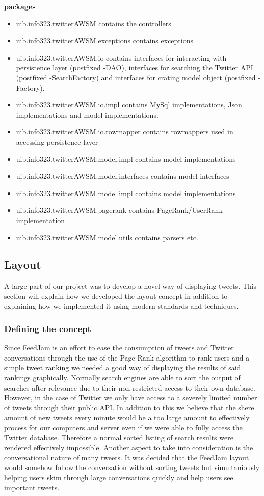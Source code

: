 {\bf packages}
\begin{itemize}
  \item uib.info323.twitterAWSM contains the controllers
  \item uib.info323.twitterAWSM.exceptions contains exceptions
  \item uib.info323.twitterAWSM.io contains interfaces for interacting with persistence layer (postfixed -DAO), interfaces for searching the Twitter API (postfixed -SearchFactory) and interfaces for crating model object (postfixed -Factory).
  \item uib.info323.twitterAWSM.io.impl contains MySql implementations, Json implementations and model implementations. 
  \item uib.info323.twitterAWSM.io.rowmapper contains rowmappers used in accessing persistence layer
  \item uib.info323.twitterAWSM.model.impl contains model implementations
  \item uib.info323.twitterAWSM.model.interfaces contains model interfaces
  \item uib.info323.twitterAWSM.model.impl contains model implementations
  \item uib.info323.twitterAWSM.pagerank contains PageRank/UserRank implementation
  \item uib.info323.twitterAWSM.model.utils contains parsers etc.
\end{itemize}


\subsection{Layout} %
A large part of our project was to develop a novel way of displaying tweets. This section will explain how we developed the layout concept in addition to explaining how we implemented it using modern standards and techniques.

\subsubsection{Defining the concept}
Since FeedJam is an effort to ease the consumption of tweets and Twitter conversations through the use of the Page Rank algorithm to rank users and a simple tweet ranking we needed a good way of displaying the results of said rankings graphically. Normally search engines are able to sort the output of searches after relevance due to their non-restricted access to their own database. However, in the case of Twitter we only have access to a severely limited number of tweets through their public API. In addition to this we believe that the shere amount of new tweets every minute would be a too large amount to effectively process for our computers and server even if we were able to fully access the Twitter database. Therefore a normal sorted listing of search results were rendered effectively impossible. Another aspect to take into consideration is the conversational nature of many tweets. It was decided that the FeedJam layout would somehow follow the conversation without sorting tweets but simultaniously helping users skim through large conversations quickly and help users see important tweets.


